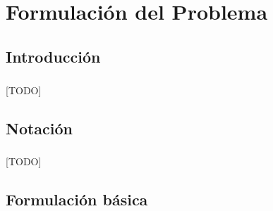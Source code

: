 \documentclass{subfiles}
\begin{document}
  \chapter{Formulación del Problema}
  \label{chap:formulation}

    \section{Introducción}
    \label{sec:formulation_introduction}

      \paragraph{}
      [TODO]

    \section{Notación}
    \label{sec:formulation_notation}

      \paragraph{}
      [TODO]


    \section{Formulación básica}
    \label{sec:formulation_basic_formulation}
\end{document}
